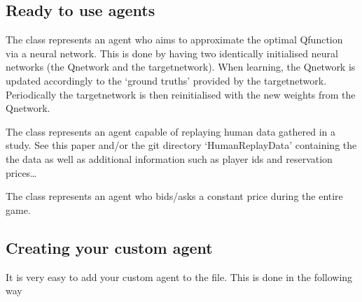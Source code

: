 \documentclass[letterpaper,10pt,english]{sphinxmanual}
\begin{document}
\subsection{Ready to use agents}
\label{\detokenize{MultiAgentMarketRL:ready-to-use-agents}}
\sphinxAtStartPar
The  class represents an agent who aims to approximate the optimal Q\sphinxhyphen{}function via a neural network. This is
done by having two identically initialised neural networks (the Q\sphinxhyphen{}network and the target\sphinxhyphen{}network). When learning, the
Q\sphinxhyphen{}network is updated accordingly to the ‘ground truths’ provided by the target\sphinxhyphen{}network. Periodically the target\sphinxhyphen{}network
is then reinitialised with the new weights from the Q\sphinxhyphen{}network.

\sphinxAtStartPar
The  class represents an agent capable of replaying human data gathered in a study. See this paper
 and/or the git directory ‘HumanReplayData’ containing the
the data as well as additional information such as player ids and reservation prices…

\sphinxAtStartPar
The  class represents an agent who bids/asks a constant price during the entire game.


\subsection{Creating your custom agent}
\label{\detokenize{MultiAgentMarketRL:creating-your-custom-agent}}
\sphinxAtStartPar
It is very easy to add your custom agent to the  file. This is done in the following way
\end{document}
